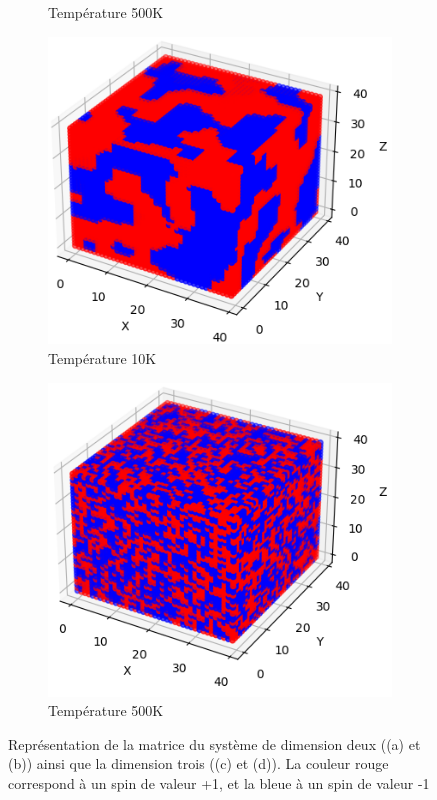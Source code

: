 \documentclass{article}
\begin{document}
\begin{figure}[htbp]
\begin{subfigure}[b]{0.22\textwidth}
    \caption{Température 500K}
    \label{2D_500K}
  \end{subfigure}\hfill
  \begin{subfigure}[b]{0.22\textwidth}
    \centering
    \includegraphics[width=\textwidth]{DW/Grille_3D_cut_10K.png}
    \caption{Température 10K}
    \label{3D_10K}
  \end{subfigure}\hfill
  \begin{subfigure}[b]{0.22\textwidth}
    \centering
    \includegraphics[width=\textwidth]{DW/Grille3D_500K.png}
    \caption{Température 500K}
    \label{3D_500}
  \end{subfigure}
  
  \caption{Représentation de la matrice du système de dimension deux ((a) et (b)) ainsi que la dimension trois ((c) et (d)). La couleur rouge correspond à un spin de valeur +1, et la bleue à un spin de valeur -1}
  \label{4TC}
\end{figure}
\end{document}
